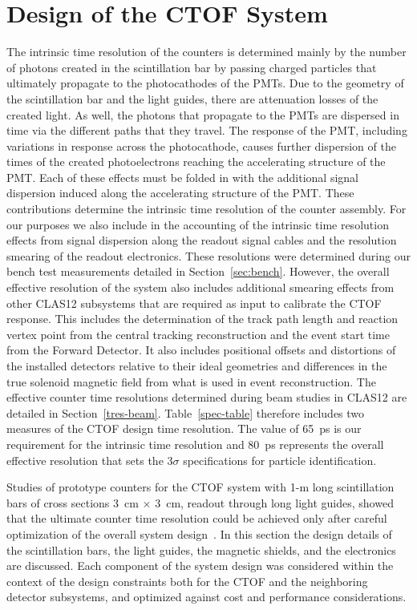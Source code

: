 \documentclass[3p,times,twocolumn]{elsarticle}
\begin{document}
\section{Design of the CTOF System}
\label{sec:design}

The intrinsic time resolution of the counters is determined mainly by the number of photons created in the
scintillation bar by passing charged particles that ultimately propagate to the photocathodes of the PMTs.
Due to the geometry of the scintillation bar and the light guides, there are attenuation losses of the created
light. As well, the photons that propagate to the PMTs are dispersed in time via the different paths that they
travel. The response of the PMT, including variations in response across the photocathode, causes further
dispersion of the times of the created photoelectrons reaching the accelerating structure of the PMT. Each
of these effects must be folded in with the additional signal dispersion induced along the accelerating structure
of the PMT. These contributions determine the intrinsic time resolution of the counter assembly. For our
purposes we also include in the accounting of the intrinsic time resolution effects from signal dispersion along
the readout signal cables and the resolution smearing of the readout electronics. These resolutions were
determined during our bench test measurements detailed in Section~\ref{sec:bench}. However, the overall
effective resolution of the system also includes additional smearing effects from other CLAS12 subsystems
that are required as input to calibrate the CTOF response. This includes the determination of the track path
length and reaction vertex point from the central tracking reconstruction and the event start time from the
Forward Detector. It also includes positional offsets and distortions of the installed detectors relative to their
ideal geometries and differences in the true solenoid magnetic field from what is used in event reconstruction.
The effective counter time resolutions determined during beam studies in CLAS12 are detailed in
Section~\ref{tres-beam}. Table~\ref{spec-table} therefore includes two measures of the CTOF design time
resolution. The value of 65~ps is our requirement for the intrinsic time resolution and 80~ps represents the
overall effective resolution that sets the 3$\sigma$ specifications for particle identification.

Studies of prototype counters for the CTOF system with 1-m long scintillation bars of cross sections 3~cm
$\times$ 3~cm, readout through long light guides, showed that the ultimate counter time resolution could be
achieved only after careful optimization of the overall system design~\cite{baturin-2009}. In this section the
design details of the scintillation bars, the light guides, the magnetic shields, and the electronics are discussed.
Each component of the system design was considered within the context of the design constraints both for the
CTOF and the neighboring detector subsystems, and optimized against cost and performance considerations. 
\end{document}
